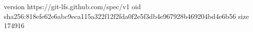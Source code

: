 version https://git-lfs.github.com/spec/v1
oid sha256:818efe62e6abc9eca115a322f12f2fda0f2e5f3db4e967928b469204bd4e6b56
size 174916

